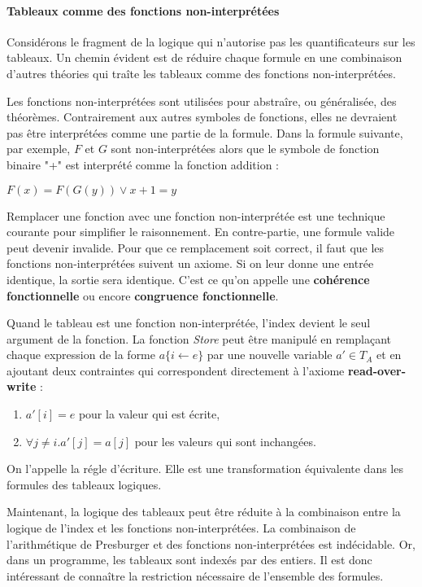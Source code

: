 \documentclass[11pt,openany]{article}
\begin{document}
	\paragraph{Tableaux comme des fonctions non-interpr\'et\'ees}
	Consid\'erons le fragment de la logique qui n'autorise pas les quantificateurs sur les tableaux. Un chemin \'evident est de r\'eduire chaque formule en une combinaison d'autres th\'eories qui tra\^ite les tableaux comme des fonctions non-interpr\'et\'ees.\par
	Les fonctions non-interpr\'et\'ees sont utilis\'ees pour abstra\^ire, ou g\'en\'eralis\'ee, des th\'eor\`emes. Contrairement aux autres symboles de fonctions, elles ne devraient pas \^etre interpr\'et\'ees comme une partie de la formule. Dans la formule suivante, par exemple, $F$ et $G$ sont non-interpr\'et\'ees alors que le symbole de fonction binaire "+" est interpr\'et\'e comme la fonction addition :\par
$F(x) = F(G(y)) \lor x+1=y$\par
Remplacer une fonction avec une fonction non-interpr\'et\'ee est une technique courante pour simplifier le raisonnement.	En contre-partie, une formule valide peut devenir invalide. Pour que ce remplacement soit correct, il faut que les fonctions non-interpr\'et\'ees suivent un axiome. Si on leur donne une entr\'ee identique, la sortie sera identique. C'est ce qu'on appelle une \textbf{coh\'erence fonctionnelle} ou encore \textbf{congruence fonctionnelle}.\par
Quand le tableau est une fonction non-interpr\'et\'ee, l'index devient le seul argument de la fonction. La fonction \textit{Store} peut \^etre manipul\'e en rempla\c{c}ant chaque expression de la forme $a\{i\leftarrow e\}$ par une nouvelle variable $a'\in T_{A}$ et en ajoutant deux contraintes qui correspondent directement \`a l'axiome \textbf{read-over-write} :\par
\begin{enumerate}
\item $a'[i]=e$ pour la valeur qui est \'ecrite,
\item $\forall j\neq i. a'[j]=a[j]$ pour les valeurs qui sont inchang\'ees.
\end{enumerate}	
	
On l'appelle la r\'egle d'\'ecriture. Elle est une transformation \'equivalente dans les formules des tableaux logiques.\par
Maintenant, la logique des tableaux peut \^etre r\'eduite \`a la combinaison entre la logique de l'index et les fonctions non-interpr\'et\'ees. La combinaison de l'arithm\'etique de Presburger et des fonctions non-interpr\'et\'ees est ind\'ecidable. Or, dans un programme, les tableaux sont index\'es par des entiers. Il est donc int\'eressant de conna\^itre la restriction n\'ecessaire de l'ensemble des formules.\par
	
\end{document}
